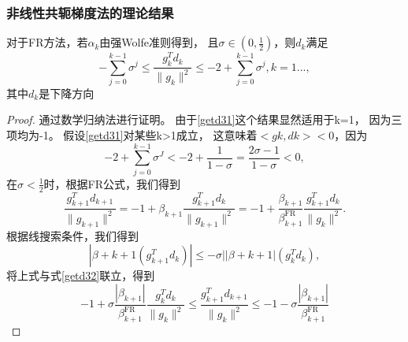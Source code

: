         \subsubsection{非线性共轭梯度法的理论结果}
        \begin{theorem}\label{71}
            对于FR方法，若$\alpha_k$由强Wolfe准则得到，
            且$\sigma\in(0,\frac{1}{2})$，则$d_k$满足
            \begin{equation}\label{getd31}
                -\displaystyle\sum^{k-1}_{j=0}\sigma^j \leq
                \displaystyle\frac{g_k^Td_k}{\|g_k\|^2}\leq
                -2 + \displaystyle\sum^{k-1}_{j=0}\sigma^j, k = 1...,
            \end{equation}其中$d_k$是下降方向\cite{1992Global}
        \end{theorem}
        \begin{proof}   
            通过数学归纳法进行证明。
            由于\ref{getd31}这个结果显然适用于k=1，
            因为三项均为-1。
            假设\ref{getd31}对某些k>1成立，
            这意味着$<gk,dk><0$，因为
            \begin{equation*}
                -2 + \displaystyle\sum^{k-1}_{j=0}\sigma^J < 
                -2 + \frac{1}{1-\sigma} = 
                \frac{2\sigma-1}{1-\sigma} < 0,
            \end{equation*}
            在$\sigma < \frac{1}{2}$时，根据FR公式，我们得到
            \begin{equation*}\label{getd32}
                \displaystyle\frac{g_{k+1}^Td_{k+1}}{\|g_{k+1}\|^2} = 
                -1 + \beta_{k+1}\displaystyle\frac{g_{k+1}^Td_k}{\|g_{k+1}\|^2} = 
                -1 + \displaystyle\frac{\beta_{k+1}}{\beta_{k+1}^{\mathrm {FR}}}
                \displaystyle\frac{g_{k+1}^Td_k}{\|g_{k}\|^2}.
            \end{equation*}
            根据线搜索条件，我们得到
            \begin{equation*}
                |\beta+{k+1}(g_{k+1}^Td_k)| \leq -\sigma||\beta+{k+1}|(g_{k}^Td_k),
            \end{equation*}
            将上式与式\ref{getd32}联立，得到
            \begin{equation}
                -1 + \sigma \displaystyle\frac{|\beta_{k+1}|}{\beta_{k+1}^{\mathrm {FR}}}
                \displaystyle\frac{g_{k}^Td_k}{\|g_{k}\|^2}
                \leq
                \displaystyle\frac{g_{k+1}^Td_{k+1}}{\|g_{k}\|^2}
                \leq
                -1 - \sigma \displaystyle\frac{|\beta_{k+1}|}{\beta_{k+1}^{\mathrm {FR}}}

\end{equation}
\end{proof}
